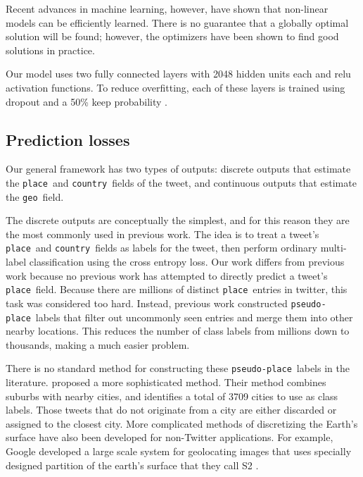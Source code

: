 \documentclass[sigconf,10pt]{acmart}
\newcommand{\tweetdata}[1]{{\texttt{#1}~}}
\newcommand{\place        }{\tweetdata{place}}
\newcommand{\pseudoplace  }{\tweetdata{pseudo-place}}
\renewcommand{\country      }{\tweetdata{country}}
\newcommand{\geo          }{\tweetdata{geo}}
\begin{document}
Recent advances in machine learning, however, have shown that non-linear models can be efficiently learned.
There is no guarantee that a globally optimal solution will be found;
however, the optimizers have been shown to find good solutions in practice.

Our model uses two fully connected layers with 2048 hidden units each and relu activation functions.
To reduce overfitting, each of these layers is trained using dropout and a 50\% keep probability \citep{}.

\subsection{Prediction losses}

Our general framework has two types of outputs:
discrete outputs that estimate the \place and \country fields of the tweet,
and continuous outputs that estimate the \geo field.

The discrete outputs are conceptually the simplest,
and for this reason they are the most commonly used in previous work.
The idea is to treat a tweet's \place and \country fields as labels for the tweet,
then perform ordinary multi-label classification using the cross entropy loss.
Our work differs from previous work because no previous work has attempted to directly predict a tweet's \place field.
Because there are millions of distinct \place entries in twitter,
this task was considered too hard.
Instead, previous work constructed \pseudoplace labels that filter out uncommonly seen entries and merge them into other nearby locations.
This reduces the number of class labels from millions down to thousands,
making a much easier problem.

There is no standard method for constructing these \pseudoplace labels in the literature.
\citet{han2012geolocation} proposed a more sophisticated method.
Their method combines suburbs with nearby cities,
and identifies a total of 3709 cities to use as class labels.
Those tweets that do not originate from a city are either discarded or assigned to the closest city.
More complicated methods of discretizing the Earth's surface have also been developed for non-Twitter applications.
For example, Google developed a large scale system for geolocating images that uses specially designed partition of the earth's surface that they call S2 \citep{weyand2016planet}.
\end{document}
